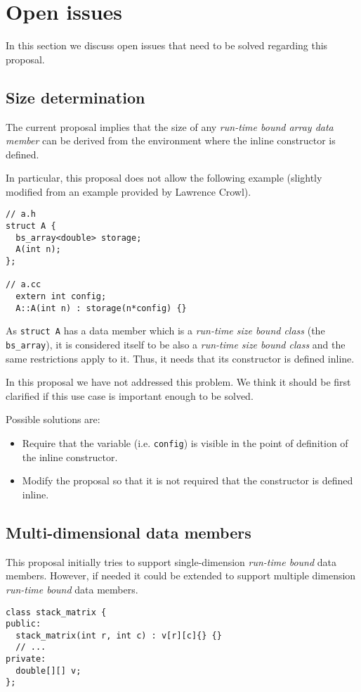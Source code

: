 \section{Open issues}

In this section we discuss open issues that need to be solved regarding this proposal.

\subsection{Size determination}

The current proposal implies that the size of any \emph{run-time bound array
data member} can be derived from the environment where the inline constructor is
defined.

In particular, this proposal does not allow the following example (slightly
modified from an example provided by Lawrence Crowl).

\begin{lstlisting}
// a.h
struct A {
  bs_array<double> storage;
  A(int n);
};

// a.cc
  extern int config;
  A::A(int n) : storage(n*config) {}
\end{lstlisting}

As \verb+struct A+ has a data member which is a \emph{run-time size bound class}
(the \verb+bs_array+), it is considered itself to be also a \emph{run-time size
bound class} and the same restrictions apply to it. Thus, it needs that its
constructor is defined inline.

In this proposal we have not addressed this problem. We think it should be first
clarified if this use case is important enough to be solved.

Possible solutions are:

\begin{itemize}

\item Require that the variable (i.e. \verb+config+) is visible in the point of definition of the
inline constructor.

\item Modify the proposal so that it is not required that the constructor is
defined inline.

\end{itemize}

\subsection{Multi-dimensional data members}

This proposal initially tries to support single-dimension \emph{run-time bound}
data members. However, if needed it could be extended to support multiple
dimension \emph{run-time bound} data members.

\begin{lstlisting}
class stack_matrix {
public:
  stack_matrix(int r, int c) : v[r][c]{} {}
  // ...
private:
  double[][] v;
};
\end{lstlisting}

